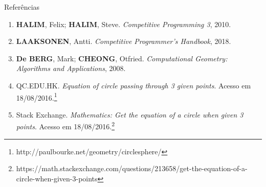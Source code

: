 \begin{frame}[fragile]{Referências}

    \begin{enumerate}
        \item \textbf{HALIM}, Felix; \textbf{HALIM}, Steve. \textit{Competitive Programming 3}, 2010.
        \item \textbf{LAAKSONEN}, Antti. \textit{Competitive Programmer's Handbook}, 2018.

        \item \textbf{De BERG}, Mark; \textbf{CHEONG}, Otfried. \textit{Computational Geometry: Algorithms and Applications}, 2008.

        \item QC.EDU.HK. \textit{Equation of circle passing through 3 given points}. Acesso em 18/08/2016.\footnote{http://paulbourke.net/geometry/circlesphere/}

        \item Stack Exchange. \textit{Mathematics: Get the equation of a circle when given 3
            points}. Acesso em 18/08/2016.\footnote{https://math.stackexchange.com/questions/213658/get-the-equation-of-a-circle-when-given-3-points}
    \end{enumerate}

\end{frame}
